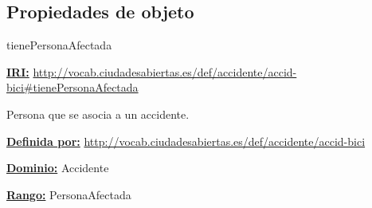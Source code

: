 \subsection{Propiedades de objeto}




\begin{mybox}{tienePersonaAfectada}
\begin{flushleft}
\underline{\textbf{IRI:}}
\url{http://vocab.ciudadesabiertas.es/def/accidente/accid-bici#tienePersonaAfectada}
\newline

Persona que se asocia a un accidente.
\newline

\underline{\textbf{Definida por:}}
\newline \url{http://vocab.ciudadesabiertas.es/def/accidente/accid-bici}
\newline

\underline{\textbf{Dominio:}} 	
\newline Accidente
\newline

\underline{\textbf{Rango:}} 
\newline PersonaAfectada

\end{flushleft}
\end{mybox}




